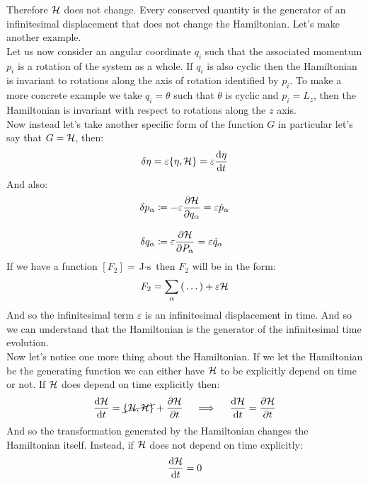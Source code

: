 Therefore $\mathcal{H}$ does not change. Every conserved quantity is the generator of an infinitesimal displacement that does not change the Hamiltonian. Let's make another example.\\
Let us now consider an angular coordinate $q_i$ such that the associated momentum $p_i$ is a rotation of the system as a whole. If $q_i$ is also cyclic then the Hamiltonian is invariant to rotations along the axis of rotation identified by $p_i$. To make a more concrete example we take $q_i = \theta$ such that $\theta$ is cyclic and $p_i = L_z$, then the Hamiltonian is invariant with respect to rotations along the $z$ axis.\\
Now instead let's take another specific form of the function $G$ in particular let's say that $G= \mathcal{H}$, then:
\begin{equation}
  \delta \vec{\eta} = \varepsilon\pb{\eta}{\hamfun} = \varepsilon\dv{\vec{\eta}}{t}
\end{equation}
And also:
\begin{equation}
  \begin{split}
      \delta p_{\alpha} &\defineeq -\varepsilon\pdv{\hamfun}{q_{\alpha}} = \varepsilon \dot{p}_{\alpha}\\[8pt]
      \delta q_{\alpha} &\defineeq \varepsilon\pdv{\hamfun}{P_{\alpha}} = \varepsilon \dot{q}_{\alpha}
  \end{split}
\end{equation}
If we have a function $[F_2] = \unit{\joule  \cdot \second}$ then $F_2$ will be in the form:
\begin{equation}
  F_2 = \displaystyle\sum_{\alpha}\left( \,\dots\, \right) + \varepsilon \mathcal{H}
\end{equation}
And so the infinitesimal term $\varepsilon$ is an infinitesimal displacement in time. And so we can understand that the Hamiltonian is the generator of the infinitesimal time evolution.\\
Now let's notice one more thing about the Hamiltonian. If we let the Hamiltonian be the generating function we can either have $\mathcal{H}$ to be explicitly depend on time or not. If $\mathcal{H}$ does depend on time explicitly then:
\begin{equation}
  \dv{\hamfun}{t} = \cancel{\pb{\hamfun}{\hamfun}} + \pdv{\hamfun}{t} \quad \implies \quad  \dv{\hamfun}{t} = \pdv{\hamfun}{t}
\end{equation}
And so the transformation generated by the Hamiltonian changes the Hamiltonian itself. Instead, if $\mathcal{H}$ does not depend on time explicitly:
\begin{equation}
  \dv{\hamfun}{t} = 0
\end{equation}
